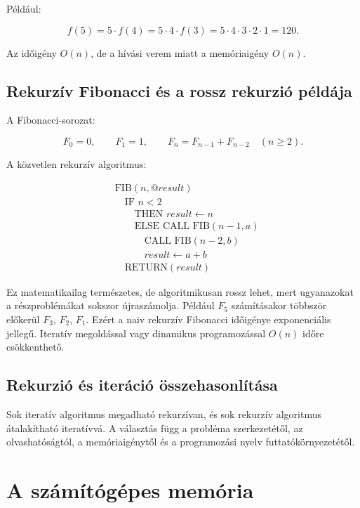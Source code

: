 Például:

\[
f(5)=5\cdot f(4)=5\cdot4\cdot f(3)=5\cdot4\cdot3\cdot2\cdot1=120.
\]

Az időigény $O(n)$, de a hívási verem miatt a memóriaigény $O(n)$.

\subsection{Rekurzív Fibonacci és a rossz rekurzió példája}

A Fibonacci-sorozat:

\[
F_0=0,\qquad F_1=1,\qquad F_n=F_{n-1}+F_{n-2}\quad(n\geq2).
\]

A közvetlen rekurzív algoritmus:

\[
\begin{aligned}
&\text{FIB}(n,@result)\\
&\quad \text{IF } n<2\\
&\quad\quad \text{THEN } result\leftarrow n\\
&\quad\quad \text{ELSE CALL FIB}(n-1,a)\\
&\quad\quad\quad \text{CALL FIB}(n-2,b)\\
&\quad\quad\quad result\leftarrow a+b\\
&\quad \text{RETURN}(result)
\end{aligned}
\]

Ez matematikailag természetes, de algoritmikusan rossz lehet, mert ugyanazokat a részproblémákat sokszor újraszámolja. Például $F_5$ számításakor többször előkerül $F_3$, $F_2$, $F_1$. Ezért a naiv rekurzív Fibonacci időigénye exponenciális jellegű. Iteratív megoldással vagy dinamikus programozással $O(n)$ időre csökkenthető.

\subsection{Rekurzió és iteráció összehasonlítása}

\begin{center}

\end{center}

Sok iteratív algoritmus megadható rekurzívan, és sok rekurzív algoritmus átalakítható iteratívvá. A választás függ a probléma szerkezetétől, az olvashatóságtól, a memóriaigénytől és a programozási nyelv futtatókörnyezetétől.

\section{A számítógépes memória}


